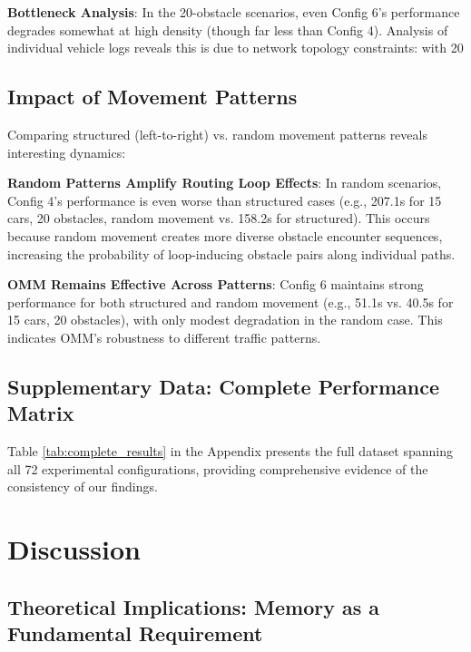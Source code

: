 \documentclass[conference]{IEEEtran}
\begin{document}
\textbf{Bottleneck Analysis}: In the 20-obstacle scenarios, even Config 6's performance degrades somewhat at high density (though far less than Config 4). Analysis of individual vehicle logs reveals this is due to network topology constraints: with 20%

\subsection{Impact of Movement Patterns}

Comparing structured (left-to-right) vs. random movement patterns reveals interesting dynamics:

\textbf{Random Patterns Amplify Routing Loop Effects}: In random scenarios, Config 4's performance is even worse than structured cases (e.g., 207.1s for 15 cars, 20 obstacles, random movement vs. 158.2s for structured). This occurs because random movement creates more diverse obstacle encounter sequences, increasing the probability of loop-inducing obstacle pairs along individual paths.

\textbf{OMM Remains Effective Across Patterns}: Config 6 maintains strong performance for both structured and random movement (e.g., 51.1s vs. 40.5s for 15 cars, 20 obstacles), with only modest degradation in the random case. This indicates OMM's robustness to different traffic patterns.

\subsection{Supplementary Data: Complete Performance Matrix}

Table \ref{tab:complete_results} in the Appendix presents the full dataset spanning all 72 experimental configurations, providing comprehensive evidence of the consistency of our findings.

\section{Discussion}

\subsection{Theoretical Implications: Memory as a Fundamental Requirement}
\end{document}
